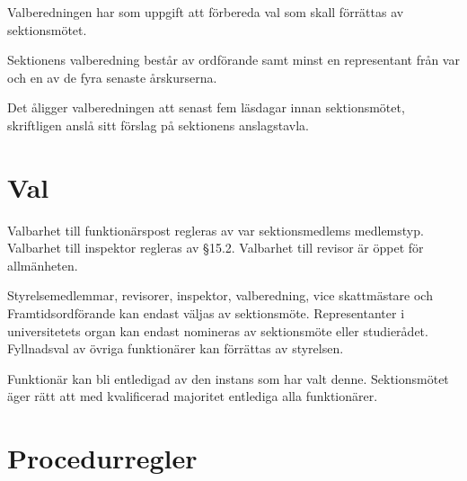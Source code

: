 \documentclass[stadgar]{dsekprotokoll}
\begin{document}
\begin{stadgeavsnitt}


Valberedningen har som uppgift att förbereda val som skall förrättas av
sektionsmötet.


Sektionens valberedning består av ordförande samt minst en representant
från var och en av de fyra senaste årskurserna.


Det åligger valberedningen att senast fem läsdagar innan
sektionsmötet, skriftligen anslå sitt förslag på sektionens anslagstavla.

\end{stadgeavsnitt}

\section{Val}

\begin{stadgeavsnitt}


Valbarhet till funktionärspost regleras av var sektionsmedlems
medlemstyp. Valbarhet till inspektor regleras av \S15.2. Valbarhet till revisor är öppet för
allmänheten.


Styrelsemedlemmar, revisorer, inspektor, valberedning, vice skattmästare och Framtidsordförande kan endast väljas av sektionsmöte.
Representanter i universitetets organ kan endast nomineras av sektionsmöte
eller studierådet. Fyllnadsval av övriga funktionärer kan förrättas av styrelsen.




Funktionär kan bli entledigad av den instans som har valt denne. Sektionsmötet äger rätt
att med kvalificerad majoritet entlediga alla funktionärer.

\end{stadgeavsnitt}

\section{Procedurregler}
\end{document}
